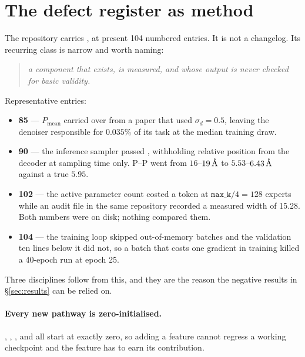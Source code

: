 \documentclass[11pt,a4paper]{article}
\begin{document}
\section{The defect register as method}
\label{sec:register}

The repository carries , at
present 104 numbered entries. It is not a changelog. Its recurring class
is narrow and worth naming:

\begin{quote}
\emph{a component that exists, is measured, and whose output is never
checked for basic validity.}
\end{quote}

Representative entries:

\begin{itemize}
\item \textbf{85} --- $P_{\text{mean}}$ carried over from a paper that
  used $\sigma_d = 0.5$, leaving the denoiser responsible for $0.035\%$
  of its task at the median training draw.
\item \textbf{90} --- the inference sampler passed ,
  withholding relative position from the decoder at sampling time only.
  P--P went from $16$--$19\,\text{\AA}$ to $5.53$--$6.43\,\text{\AA}$ against a true
  $5.95$.
\item \textbf{102} --- the active parameter count costed a token at
  $\texttt{max\_k}/4 = 128$ experts while an audit file in the same
  repository recorded a measured width of 15.28. Both numbers were on
  disk; nothing compared them.
\item \textbf{104} --- the training loop skipped out-of-memory batches
  and the validation ten lines below it did not, so a batch that costs
  one gradient in training killed a 40-epoch run at epoch 25.
\end{itemize}

Three disciplines follow from this, and they are the reason the negative
results in \S\ref{sec:results} can be relied on.

\paragraph{Every new pathway is zero-initialised.} ,
, ,  and
 all start at exactly zero, so adding a feature
cannot regress a working checkpoint and the feature has to earn its
contribution.
\end{document}
